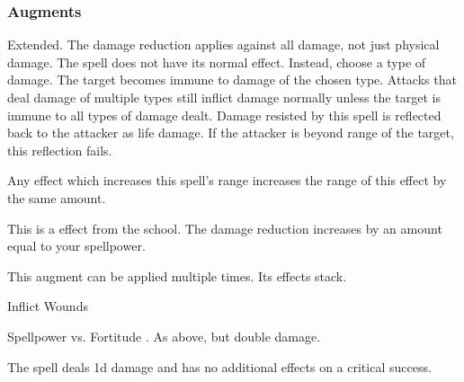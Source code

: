 \subsubsection{Augments}
 Extended.
The damage reduction applies against all damage, not just physical damage.
The spell does not have its normal effect.
Instead, choose a type of damage.
The target becomes immune to damage of the chosen type.
Attacks that deal damage of multiple types still inflict damage normally unless the target is immune to all types of damage dealt.
Damage resisted by this spell is reflected back to the attacker as life damage.
If the attacker is beyond \rngclose range of the target, this reflection fails.
\par Any effect which increases this spell's range increases the range of this effect by the same amount.
\par
This is a  effect from the  school.
The damage reduction increases by an amount equal to your spellpower.
\par
This augment can be applied multiple times.
Its effects stack.
\begin{spellsection}{Inflict Wounds}
\begin{spellcontent}
\begin{spelltargetinginfo}
\end{spelltargetinginfo}
\begin{spelleffects}
\begin{spellattack}{Spellpower vs. Fortitude}
\spellsuccess {}.
\spellcritical As above, but double damage.
\end{spellattack}
\end{spelleffects}
\end{spellcontent}
\begin{spellfooter}
\miscastexplode
\end{spellfooter}
\begin{spellcantrip}
The spell deals \minus1d damage and has no additional effects on a critical success.
\end{spellcantrip}
\end{spellsection}
